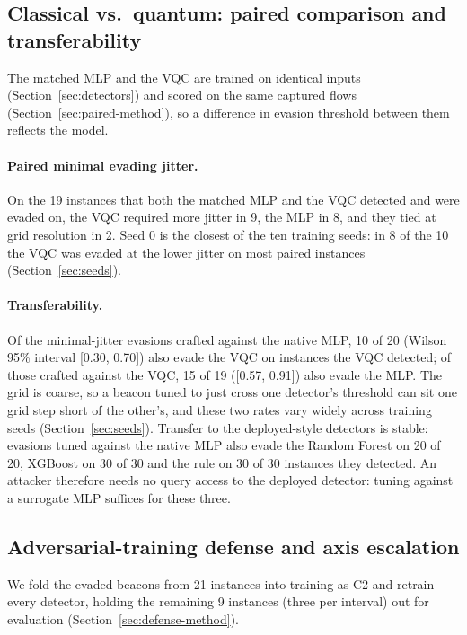 \documentclass[preprint,12pt]{elsarticle}
\begin{document}
\subsection{Classical vs.\ quantum: paired comparison and transferability}
\label{sec:paired}
The matched MLP and the VQC are trained on identical inputs (Section~\ref{sec:detectors}) and scored on
the same captured flows (Section~\ref{sec:paired-method}), so a difference in evasion threshold between
them reflects the model.

\paragraph{Paired minimal evading jitter.} On the 19 instances that both the matched MLP and the VQC
detected and were evaded on, the VQC required more jitter in 9, the MLP in 8, and they tied at grid
resolution in 2. Seed 0 is the closest of the ten training seeds: in 8 of the 10 the VQC was evaded at
the lower jitter on most paired instances (Section~\ref{sec:seeds}).

\paragraph{Transferability.} Of the minimal-jitter evasions crafted against the native MLP, 10 of 20
(Wilson 95\% interval [0.30, 0.70]) also evade the VQC on instances the VQC detected; of those crafted
against the VQC, 15 of 19 ([0.57, 0.91]) also evade the MLP. The grid is coarse, so a beacon tuned to just cross one detector's
threshold can sit one grid step short of the other's, and these two rates vary widely across training
seeds (Section~\ref{sec:seeds}). Transfer to the deployed-style detectors is stable: evasions tuned
against the native MLP also evade the Random Forest on 20 of 20, XGBoost on 30 of 30 and the rule on
30 of 30 instances they detected. An attacker therefore needs no query access to the deployed detector:
tuning against a surrogate MLP suffices for these three.

\subsection{Adversarial-training defense and axis escalation}
\label{sec:defense}
We fold the evaded beacons from 21 instances into training as C2 and retrain every detector, holding
the remaining 9 instances (three per interval) out for evaluation (Section~\ref{sec:defense-method}).
\end{document}
